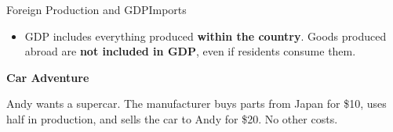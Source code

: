 \documentclass[10pt,aspectratio=169]{beamer}
\begin{document}
\begin{frame}{Foreign Production and GDP}{Imports}

\begin{itemize}
\item GDP includes everything produced \textbf{within the country}.  
\itemvso Goods produced abroad are \textbf{not included in GDP}, even if residents consume them.
\end{itemize}
\vspace{0.3cm}
\textbf{ Car Adventure}

\begin{itemize}
\itemvso Andy wants a supercar. The manufacturer buys parts from Japan for \$10, uses half in production, and sells the car to Andy for \$20. No other costs.  
\end{itemize}

\begin{table}
\end{table}

\end{frame}
\end{document}
